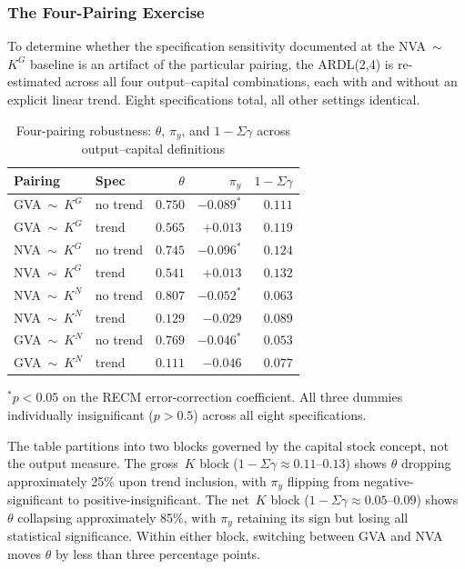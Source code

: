 \documentclass[11pt,a4paper]{article}
\begin{document}
\subsubsection{The Four-Pairing Exercise}

To determine whether the specification sensitivity documented at the NVA~$\sim$~$K^G$ baseline is an artifact of the particular pairing, the ARDL(2,4) is re-estimated across all four output--capital combinations, each with and without an explicit linear trend. Eight specifications total, all other settings identical.

\begin{table}[!ht]
	\centering
	\small
	\caption{Four-pairing robustness: $\theta$, $\pi_y$, and $1 - \Sigma\gamma$ across output--capital definitions}
	\label{tab:S0_four_pairings}
	\begin{tabular}{llrrr}
		\toprule
		Pairing & Spec & $\theta$ & $\pi_y$ & $1 - \Sigma\gamma$ \\
		\midrule
		GVA~$\sim$~$K^G$ & no trend & $0.750$ & $-0.089^{*}$ & $0.111$ \\
		GVA~$\sim$~$K^G$ & trend    & $0.565$ & $+0.013$     & $0.119$ \\
		NVA~$\sim$~$K^G$ & no trend & $0.745$ & $-0.096^{*}$ & $0.124$ \\
		NVA~$\sim$~$K^G$ & trend    & $0.541$ & $+0.013$     & $0.132$ \\
		\addlinespace
		NVA~$\sim$~$K^N$ & no trend & $0.807$ & $-0.052^{*}$ & $0.063$ \\
		NVA~$\sim$~$K^N$ & trend    & $0.129$ & $-0.029$     & $0.089$ \\
		GVA~$\sim$~$K^N$ & no trend & $0.769$ & $-0.046^{*}$ & $0.053$ \\
		GVA~$\sim$~$K^N$ & trend    & $0.111$ & $-0.046$     & $0.077$ \\
		\bottomrule
	\end{tabular}
	\par\vspace{0.3em}
	\footnotesize $^{*}p<0.05$ on the RECM error-correction coefficient. All three dummies individually insignificant ($p > 0.5$) across all eight specifications.
\end{table}

The table partitions into two blocks governed by the capital stock concept, not the output measure. The gross~$K$ block ($1 - \Sigma\gamma \approx 0.11$--$0.13$) shows $\theta$ dropping approximately 25\% upon trend inclusion, with $\pi_y$ flipping from negative-significant to positive-insignificant. The net~$K$ block ($1 - \Sigma\gamma \approx 0.05$--$0.09$) shows $\theta$ collapsing approximately 85\%, with $\pi_y$ retaining its sign but losing all statistical significance. Within either block, switching between GVA and NVA moves $\theta$ by less than three percentage points.
\end{document}
